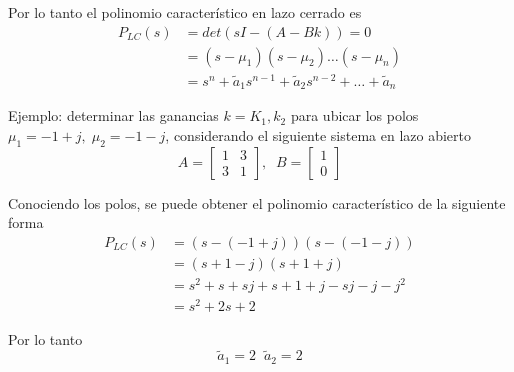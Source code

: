 Por lo tanto el polinomio característico en lazo cerrado es
\[
    \begin{split}
        P_{LC}(s) & = det(sI-(A -Bk)) = 0\\
        & = (s-\mu_{1}) (s-\mu_{2}) \ldots (s-\mu_{n})\\
        & = s^{n} + \tilde{a}_{1}s^{n-1} + \tilde{a}_{2}s^{n-2} + \ldots + \tilde{a}_{n}
    \end{split}
\]

Ejemplo: determinar las ganancias \( k = K_{1}, k_{2} \) para ubicar los polos \( \mu_{1} = -1+j,\; \mu_{2}=-1-j \), considerando el siguiente sistema en lazo abierto
\[
    A =
    \begin{bmatrix}
        1 & 3 \\
        3 & 1 
    \end{bmatrix}, \;\;
    B = 
    \begin{bmatrix}
        1 \\ 0
    \end{bmatrix}
\]

Conociendo los polos, se puede obtener el polinomio característico de la siguiente forma
\[
    \begin{split}
        P_{LC}(s) & = (s-(-1+j)) (s-(-1-j)) \\
        & = (s+1-j) (s+1+j) \\
        & = s^{2} + s + sj + s + 1 + j - sj -j -j^{2} \\
        & = s^{2} + 2s + 2
    \end{split}
\]

Por lo tanto
\[
    \tilde{a}_{1} = 2 \;\; \tilde{a}_{2} = 2
\]

